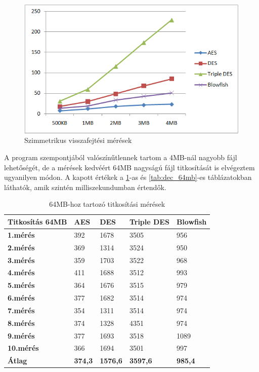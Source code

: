 \begin{figure}[H]
	\centering
	\includegraphics[scale=0.8]{images/alg_graf_2.png}
	\caption{Szimmetrikus visszafejtési mérések}
	\label{fig:alg_visszafejtes_graf}
\end{figure}


\vspace{5pt} \noindent A program szempontjából valószínűtlennek tartom a 4MB-nál nagyobb fájl lehetőségét, de a mérések kedvéért 64MB nagyságú fájl titkosítását is elvégeztem ugyanilyen módon. 
A kapott értékek a \ref{tab:enc_64mb}-as és \ref{tab:dec_64mb}-es táblázatokban láthatók, amik szintén milliszekundumban értendők.
\begin{table}[H]
	\centering
	\caption{64MB-hoz tartozó titkosítási mérések}
	\label{tab:enc_64mb}
	\medskip
	\begin{tabular}{|p{2.4cm}|p{2cm}|p{2cm}|p{2cm}|p{2cm}|}
		\hline
		\textbf{Titkosítás} \newline \textbf{64MB} & \textbf{AES} & \textbf{DES} & \textbf{Triple DES} & \textbf{Blowfish}\\
		\hline
		\textbf{1.mérés} & 392 & 1678 & 3505 & 956\\
		\hline
		\textbf{2.mérés} & 369 & 1314 & 3524 & 950\\
		\hline
		\textbf{3.mérés} & 359 & 1703 & 3522 & 968\\
		\hline
		\textbf{4.mérés} & 411 & 1688 & 3512 & 993\\
		\hline
		\textbf{5.mérés} & 364 & 1676 & 3515 & 979\\
		\hline
		\textbf{6.mérés} & 377 & 1682 & 3514 & 974\\
		\hline
		\textbf{7.mérés} & 354 & 1311 & 3514 & 974\\
		\hline
		\textbf{8.mérés} & 374 & 1328 & 4351 & 974\\
		\hline
		\textbf{9.mérés} & 377 & 1693 & 3518 & 1089\\
		\hline
		\textbf{10.mérés} & 366 & 1694 & 3501 & 997\\
		\hline
		\hline
		\textbf{Átlag} & \textbf{374,3} & \textbf{1576,6} & \textbf{3597,6} & \textbf{985,4}\\
		\hline
	\end{tabular}
\end{table}

